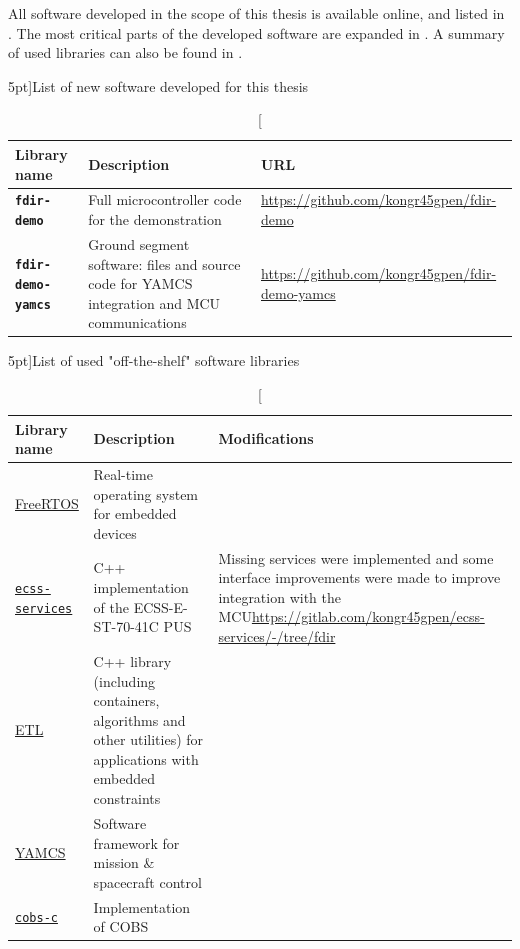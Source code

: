 \documentclass[a4paper,nobib]{tufte-book}
\begin{document}
All software developed in the scope of this thesis is available online, and listed in . The most critical parts of the developed software are expanded in . A summary of used libraries can also be found in .

\begin{table}[h]
	\centering
	\caption[][5pt]{List of new software developed for this thesis}
	\label{tab:new_software}
	\begin{tabularx}{\textwidth}{@{}lXp{6cm}@{}}
		\toprule
		Library name & Description & URL \\ \midrule
		\textbf{\texttt{fdir-demo}} & Full microcontroller code for the demonstration & \small \url{https://github.com/kongr45gpen/fdir-demo} \\
		\textbf{\texttt{fdir-demo-yamcs}} & Ground segment software: files and source code for \acs{YAMCS} integration and \acs{MCU} communications & \small \url{https://github.com/kongr45gpen/fdir-demo-yamcs} \\
		\bottomrule
	\end{tabularx}
\end{table}

\begin{table}[h]
	\centering
	\vspace{2em}
	\caption[][5pt]{List of used "off-the-shelf" software libraries}
	\label{tab:old_software}
	\begin{tabularx}{\textwidth}{@{}lp{6cm}X@{}}
		\toprule
		Library name & Description & Modifications \\ \midrule
		\href{https://www.freertos.org/}{FreeRTOS} & Real-time operating system for embedded devices & \\
		\href{https://gitlab.com/acubesat/obc/ecss-services}{\texttt{ecss-services}} & C++ implementation of the ECSS-E-ST-70-41C \acl{PUS} %
		& \small Missing services were implemented and some interface improvements were made to improve integration with the \acs{MCU}\newline\small\url{https://gitlab.com/kongr45gpen/ecss-services/-/tree/fdir}
		 \\
		 \href{https://www.etlcpp.com/}{\acs{ETL}}  & C++ library (including containers, algorithms and other utilities) for applications with embedded constraints &
		 \\
 		\href{https://github.com/yamcs/yamcs}{\acs{YAMCS}}  & Software framework for mission \& spacecraft control & %
 		\\
		\href{https://github.com/cmcqueen/cobs-c}{\texttt{cobs-c}}  & Implementation of \ac{COBS} %
		 & \\
		\bottomrule
	\end{tabularx}
\end{table}
\end{document}
